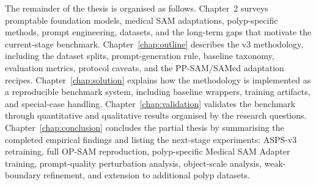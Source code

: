 The remainder of the thesis is organised as follows. Chapter~2 surveys promptable foundation models, medical SAM adaptations, polyp-specific methods, prompt engineering, datasets, and the long-term gaps that motivate the current-stage benchmark. Chapter~\ref{chap:outline} describes the v3 methodology, including the dataset splits, prompt-generation rule, baseline taxonomy, evaluation metrics, protocol caveats, and the PP-SAM/SAMed adaptation recipes. Chapter~\ref{chap:solution} explains how the methodology is implemented as a reproducible benchmark system, including baseline wrappers, training artifacts, and special-case handling. Chapter~\ref{chap:validation} validates the benchmark through quantitative and qualitative results organised by the research questions. Chapter~\ref{chap:conclusion} concludes the partial thesis by summarising the completed empirical findings and listing the next-stage experiments: ASPS-v3 retraining, full OP-SAM reproduction, polyp-specific Medical SAM Adapter training, prompt-quality perturbation analysis, object-scale analysis, weak-boundary refinement, and extension to additional polyp datasets.
